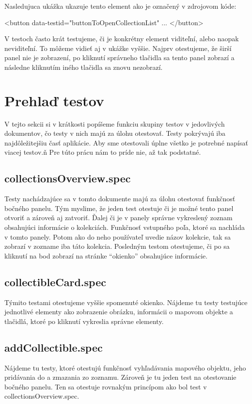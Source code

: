 Nasledujuca ukážka ukazuje tento element ako je označený v zdrojovom kóde:
\begin{code}
      <button data-testid="buttonToOpenCollectionList" ... </button>
\end{code}

V testoch často krát testujeme, či je konkrétny element viditeľní, alebo naopak neviditeľní. To môžeme vidieť aj v ukážke vyššie. Najprv otestujeme, že širší panel nie je zobrazení, 
po kliknutí správneho tlačidla sa tento panel zobrazí a následne kliknutím iného tlačidla sa znovu nezobrazí. 

\section{Prehlaď testov}

V tejto sekcii si v krátkosti popíšeme funkciu skupiny testov v jedovlivých dokumentov, čo testy v nich majú za úlohu otestovať. 
Testy pokrývajú iba najdôležitejšiu časť aplikácie. Aby sme otestovali úplne všetko je potrebné napísať viacej testov.ň
Pre túto prácu nám to príde nie, až tak podstatné.

\subsection*{collectionsOverview.spec}
Testy nachádzajúce sa v tomto dokumente majú za úlohu otestovať funkčnosť bočného panelu. 
Tým myslime, že jeden test otestuje či je možné tento panel otvoriť a zároveň aj zatvoriť. Ďalej či je v panely správne vykreslený zoznam obsahujúci informácie o kolekciách. 
Funkčnosť vstupného poľa, ktoré sa nachláda v tomto panely. Potom ako do neho používateľ uvedie názov kolekcie, tak sa zobrazí v zozname iba táto kolekcia. 
Posledným testom otestujeme, či po sa kliknutí na bod zobrazí na stránke “okienko” obsahujúce informácie. 

\subsection*{collectibleCard.spec}
Týmito testami otestujeme vyššie spomenuté okienko.  
Nájdeme tu testy testujúce jednotlivé elementy ako zobrazenie obrázku, informácii o mapovom objekte a tlačidlá, ktoré po kliknutí vykreslia správne elementy. 

\subsection*{addCollectible.spec}
Nájdeme tu testy, ktoré otestujú funkčnosť vyhľadávania mapového objektu, jeho pridávania do a zmazania zo zoznamu. 
Zároveň je tu jeden test na otestovanie bočného panelu. Ten sa otestuje rovnakým princípom ako bol test v collectionsOverview.spec. 

